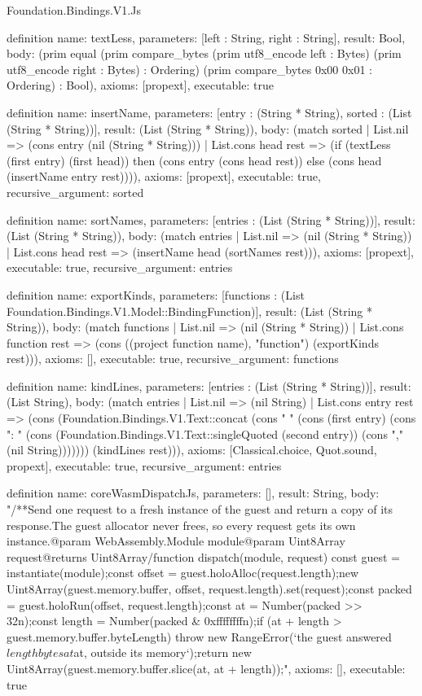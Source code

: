 \begin{lexlean}{Foundation.Bindings.V1.Js}
\begin{semanticmodule}
definition{
  name: textLess,
  parameters: [left : String, right : String],
  result: Bool,
  body: (prim equal (prim compare_bytes (prim utf8_encode left : Bytes) (prim utf8_encode right : Bytes) : Ordering) (prim compare_bytes 0x00 0x01 : Ordering) : Bool),
  axioms: [propext],
  executable: true
}

definition{
  name: insertName,
  parameters: [entry : (String * String), sorted : (List (String * String))],
  result: (List (String * String)),
  body: (match sorted
    | List.nil => (cons entry (nil (String * String)))
    | List.cons head rest => (if (textLess (first entry) (first head)) then (cons entry (cons head rest)) else (cons head (insertName entry rest)))),
  axioms: [propext],
  executable: true,
  recursive_argument: sorted
}

definition{
  name: sortNames,
  parameters: [entries : (List (String * String))],
  result: (List (String * String)),
  body: (match entries
    | List.nil => (nil (String * String))
    | List.cons head rest => (insertName head (sortNames rest))),
  axioms: [propext],
  executable: true,
  recursive_argument: entries
}

definition{
  name: exportKinds,
  parameters: [functions : (List Foundation.Bindings.V1.Model::BindingFunction)],
  result: (List (String * String)),
  body: (match functions
    | List.nil => (nil (String * String))
    | List.cons function rest => (cons ((project function name), "function") (exportKinds rest))),
  axioms: [],
  executable: true,
  recursive_argument: functions
}

definition{
  name: kindLines,
  parameters: [entries : (List (String * String))],
  result: (List String),
  body: (match entries
    | List.nil => (nil String)
    | List.cons entry rest => (cons (Foundation.Bindings.V1.Text::concat (cons "  " (cons (first entry) (cons ": " (cons (Foundation.Bindings.V1.Text::singleQuoted (second entry)) (cons "," (nil String))))))) (kindLines rest))),
  axioms: [Classical.choice, Quot.sound, propext],
  executable: true,
  recursive_argument: entries
}

definition{
  name: coreWasmDispatchJs,
  parameters: [],
  result: String,
  body: "/**\n * Send one request to a fresh instance of the guest and return a copy of its response.\n * The guest allocator never frees, so every request gets its own instance.\n * @param {WebAssembly.Module} module\n * @param {Uint8Array} request\n * @returns {Uint8Array}\n */\nexport function dispatch(module, request) {\n  const guest = instantiate(module);\n  const offset = guest.holoAlloc(request.length);\n  new Uint8Array(guest.memory.buffer, offset, request.length).set(request);\n  const packed = guest.holoRun(offset, request.length);\n  const at = Number(packed >> 32n);\n  const length = Number(packed & 0xffffffffn);\n  if (at + length > guest.memory.buffer.byteLength) {\n    throw new RangeError(`the guest answered ${length} bytes at ${at}, outside its memory`);\n  }\n  return new Uint8Array(guest.memory.buffer.slice(at, at + length));\n}",
  axioms: [],
  executable: true
}


\end{semanticmodule}
\end{lexlean}
